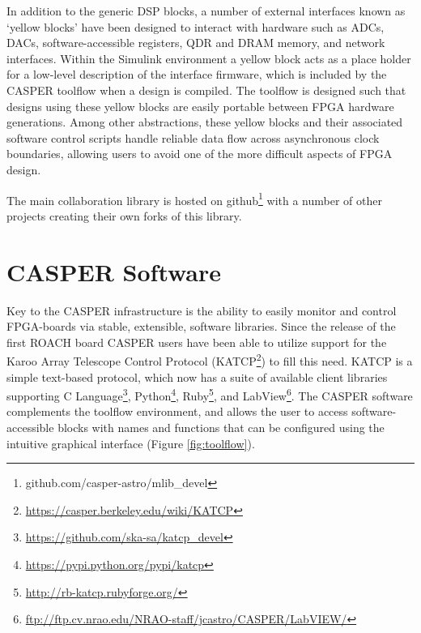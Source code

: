\documentclass{ws-jai}
\begin{document}
In addition to the generic DSP blocks, a number of external interfaces known as
`yellow blocks' have been designed to interact with hardware such as
ADCs, DACs, software-accessible registers, QDR and DRAM memory, and network
interfaces. 
Within the Simulink environment a yellow block acts as a place holder for a low-level description of the interface firmware, which is included by the CASPER toolflow when a design is compiled. The toolflow is designed such that designs using these yellow blocks are easily portable between FPGA hardware generations.
Among other abstractions, these yellow blocks and their associated software control scripts handle reliable data flow across asynchronous clock boundaries, allowing users to avoid one of the more difficult aspects of FPGA design.

The main collaboration library is hosted on
github\footnote{github.com/casper-astro/mlib\_devel} with a number of
other projects creating their own forks of this library.

\section{CASPER Software} \label{sec:Software}
Key to the CASPER infrastructure is the ability to easily monitor and control
FPGA-boards via stable, extensible, software libraries. Since the release of the
first ROACH board CASPER users have been able to utilize support for the Karoo
Array Telescope Control Protocol
(KATCP\footnote{\url{https://casper.berkeley.edu/wiki/KATCP}}) to fill this
need. KATCP is a simple text-based protocol, which now has a suite of available
client libraries supporting C Language\footnote{\url{https://github.com/ska-sa/katcp_devel}}, Python\footnote{\url{https://pypi.python.org/pypi/katcp}}, Ruby\footnote{\url{http://rb-katcp.rubyforge.org/}}, and LabView\footnote{\url{ftp://ftp.cv.nrao.edu/NRAO-staff/jcastro/CASPER/LabVIEW/}}.
The CASPER software complements the toolflow environment, and allows the user to access software-accessible blocks with names and functions that can be configured using the intuitive graphical interface (Figure \ref{fig:toolflow}). 
\end{document}
